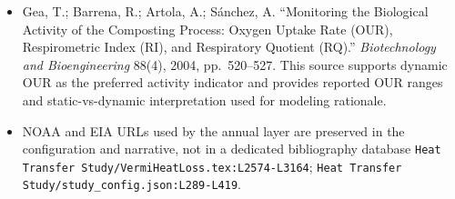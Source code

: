 \documentclass[11pt]{article}
\newcommand{\srcref}[1]{\nolinkurl{#1}}
\begin{document}
\begin{itemize}[leftmargin=*]
\item [R21] Gea, T.; Barrena, R.; Artola, A.; S\'anchez, A. ``Monitoring the Biological Activity of the Composting Process: Oxygen Uptake Rate (OUR), Respirometric Index (RI), and Respiratory Quotient (RQ).'' \emph{Biotechnology and Bioengineering} 88(4), 2004, pp.~520--527. This source supports dynamic OUR as the preferred activity indicator and provides reported OUR ranges and static-vs-dynamic interpretation used for modeling rationale.
\item NOAA and EIA URLs used by the annual layer are preserved in the configuration and narrative, not in a dedicated bibliography database \srcref{Heat Transfer Study/VermiHeatLoss.tex:L2574-L3164}; \srcref{Heat Transfer Study/study_config.json:L289-L419}.
\end{itemize}
\end{document}
